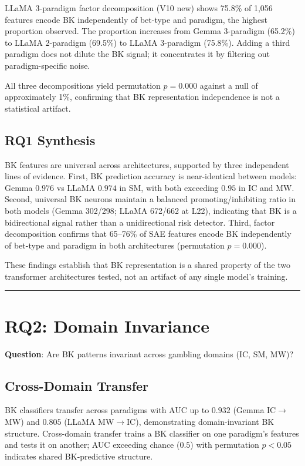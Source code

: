 \documentclass[11pt,a4paper]{article}
\begin{document}
\noindent LLaMA 3-paradigm factor decomposition (V10 new) shows 75.8\% of 1,056 features encode BK independently of bet-type and paradigm, the highest proportion observed. The proportion increases from Gemma 3-paradigm (65.2\%) to LLaMA 2-paradigm (69.5\%) to LLaMA 3-paradigm (75.8\%). Adding a third paradigm does not dilute the BK signal; it concentrates it by filtering out paradigm-specific noise.

\medskip\noindent All three decompositions yield permutation $p=0.000$ against a null of approximately 1\%, confirming that BK representation independence is not a statistical artifact.

\subsection{RQ1 Synthesis}

BK features are universal across architectures, supported by three independent lines of evidence. First, BK prediction accuracy is near-identical between models: Gemma $0.976$ vs LLaMA $0.974$ in SM, with both exceeding $0.95$ in IC and MW. Second, universal BK neurons maintain a balanced promoting/inhibiting ratio in both models (Gemma 302/298; LLaMA 672/662 at L22), indicating that BK is a bidirectional signal rather than a unidirectional risk detector. Third, factor decomposition confirms that 65--76\% of SAE features encode BK independently of bet-type and paradigm in both architectures (permutation $p=0.000$).

\medskip\noindent These findings establish that BK representation is a shared property of the two transformer architectures tested, not an artifact of any single model's training.

\bigskip\hrule\bigskip

\section{RQ2: Domain Invariance}

\noindent\textbf{Question}: Are BK patterns invariant across gambling domains (IC, SM, MW)?

\subsection{Cross-Domain Transfer}

BK classifiers transfer across paradigms with AUC up to $0.932$ (Gemma IC$\rightarrow$MW) and $0.805$ (LLaMA MW$\rightarrow$IC), demonstrating domain-invariant BK structure. Cross-domain transfer trains a BK classifier on one paradigm's features and tests it on another; AUC exceeding chance ($0.5$) with permutation $p<0.05$ indicates shared BK-predictive structure.
\end{document}
